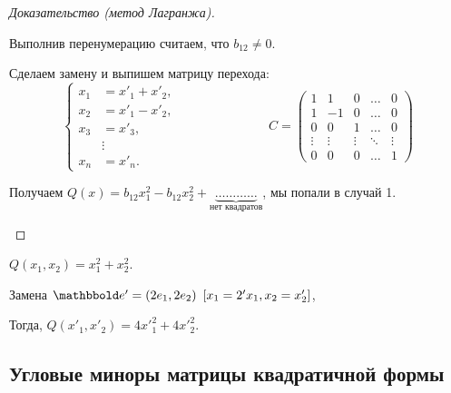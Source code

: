 \begin{proof}[Доказательство (метод Лагранжа)]
\begin{description}
\begin{enumerate}[start=0,label=Случай \arabic*.]
            Выполнив перенумерацию считаем, что $b_{12} \neq 0$.

            Сделаем замену и выпишем матрицу перехода:
            \begin{equation*}
                \begin{cases}
                    x_1 &= x'_1 + x'_2, \\
                    x_2 &= x'_1 - x'_2, \\
                    x_3 &= x'_3, \\
                        &\vdots \\
                    x_n &= x'_n.
                \end{cases}
                \hspace{3cm}
                C = \begin{pmatrix} 
                    1 & 1 & 0 & \dots & 0 \\
                    1 & -1 & 0 & \dots & 0 \\
                    0 & 0 & 1 & \dots & 0 \\
                    \vdots & \vdots & \vdots & \ddots & \vdots \\
                    0 & 0 & 0 & \dots & 1
                \end{pmatrix}
            \end{equation*}

            Получаем $Q(x) = b_{12} x_1^2 - b_{12} x_2^2 + \underbrace{\dots\dots\dots\dots}_{\text{нет квадратов}}$, мы попали в случай 1.
            \qedhere
        \end{enumerate}
    \end{description}
\end{proof}

\begin{example}
    $Q(x_1, x_2) = x_1^2 + x_2^2$.

    Замена $\E' = (2e_1, 2e_2) \ \left[x_1 = 2'x_1, x_2 = x'_2\right]$,

    Тогда, $Q(x'_1, x'_2) = 4x'^2_1 + 4x'^2_2$.
\end{example}


\subsection{Угловые миноры матрицы квадратичной формы}

